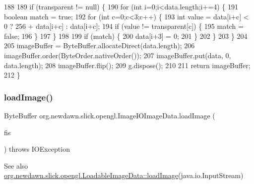 \begin{DoxyCode}
188         
189         \textcolor{keywordflow}{if} (transparent != null) \{
190             \textcolor{keywordflow}{for} (\textcolor{keywordtype}{int} i=0;i<data.length;i+=4) \{
191                 \textcolor{keywordtype}{boolean} match = \textcolor{keyword}{true};
192                 \textcolor{keywordflow}{for} (\textcolor{keywordtype}{int} c=0;c<3;c++) \{
193                     \textcolor{keywordtype}{int} value = data[i+c] < 0 ? 256 + data[i+c] : data[i+c];
194                     \textcolor{keywordflow}{if} (value != transparent[c]) \{
195                         match = \textcolor{keyword}{false};
196                     \}
197                 \}
198       
199                 \textcolor{keywordflow}{if} (match) \{
200                     data[i+3] = 0;
201                 \}
202             \}
203         \}
204         
205         imageBuffer = ByteBuffer.allocateDirect(data.length); 
206         imageBuffer.order(ByteOrder.nativeOrder()); 
207         imageBuffer.put(data, 0, data.length); 
208         imageBuffer.flip();
209         g.dispose();
210         
211         \textcolor{keywordflow}{return} imageBuffer; 
212     \}
\end{DoxyCode}
\mbox{\label{classorg_1_1newdawn_1_1slick_1_1opengl_1_1_image_i_o_image_data_aa524a7c6717557a6ac60d1ac8b413950}} 
\subsubsection{\texorpdfstring{load\+Image()}{loadImage()}\hspace{0.1cm}{\footnotesize\ttfamily [1/3]}}
{\footnotesize\ttfamily Byte\+Buffer org.\+newdawn.\+slick.\+opengl.\+Image\+I\+O\+Image\+Data.\+load\+Image (\begin{DoxyParamCaption}\item[{Input\+Stream}]{fis }\end{DoxyParamCaption}) throws I\+O\+Exception\hspace{0.3cm}{\ttfamily [inline]}}

\begin{DoxySeeAlso}{See also}
\mbox{\hyperlink{interfaceorg_1_1newdawn_1_1slick_1_1opengl_1_1_loadable_image_data_a640021b955dde7deeeeabb5ac3738d2b}{org.\+newdawn.\+slick.\+opengl.\+Loadable\+Image\+Data\+::load\+Image}}(java.\+io.\+Input\+Stream) 
\end{DoxySeeAlso}


